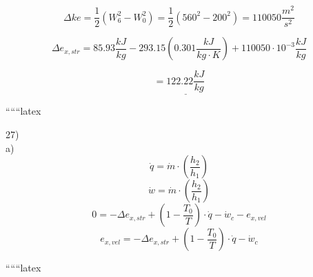 \[
\Delta ke = \frac{1}{2} (W_6^2 - W_0^2) = \frac{1}{2} (560^2 - 200^2) = 110050 \frac{m^2}{s^2}
\]

\[
\Delta e_{x,str} = 85.93 \frac{kJ}{kg} - 293.15 (0.301 \frac{kJ}{kg \cdot K}) + 110050 \cdot 10^{-3} \frac{kJ}{kg}
\]

\[
= \underline{122.22 \frac{kJ}{kg}}
\]

``````latex

27) \\
a) \\
\[
\dot{q} = \dot{m} \cdot \left( \frac{h_2}{h_1} \right)
\]
\[
\dot{w} = \dot{m} \cdot \left( \frac{h_2}{h_1} \right)
\]
\[
0 = -\Delta e_{x,str} + \left( 1 - \frac{T_0}{T} \right) \cdot \dot{q} - \dot{w}_c - e_{x,vel}
\]
\[
e_{x,vel} = -\Delta e_{x,str} + \left( 1 - \frac{T_0}{T} \right) \cdot \dot{q} - \dot{w}_c
\]

``````latex


